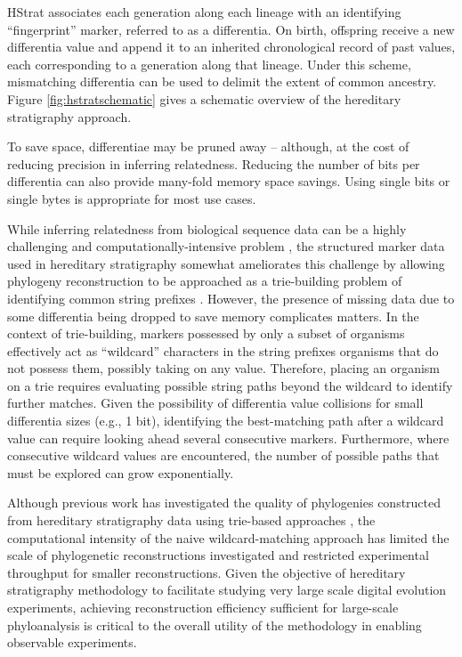 HStrat associates each generation along each lineage with an identifying ``fingerprint'' marker, referred to as a differentia.
On birth, offspring receive a new differentia value and append it to an inherited chronological record of past values, each corresponding to a generation along that lineage.
Under this scheme, mismatching differentia can be used to delimit the extent of common ancestry.
Figure \ref{fig:hstratschematic} gives a schematic overview of the hereditary stratigraphy approach.

To save space, differentiae may be pruned away -- although, at the cost of reducing precision in inferring relatedness.
Reducing the number of bits per differentia can also provide many-fold memory space savings.
Using single bits or single bytes is appropriate for most use cases.

While inferring relatedness from biological sequence data can be a highly challenging and computationally-intensive problem \citep{miller2010creating},
the structured marker data used in hereditary stratigraphy somewhat ameliorates this challenge by allowing phylogeny reconstruction to be approached as a trie-building problem of identifying common string prefixes \citep{delabriandais1959file,moreno2024analysis}.
However, the presence of missing data due to some differentia being dropped to save memory complicates matters.
In the context of trie-building, markers possessed by only a subset of organisms effectively act as ``wildcard'' characters in the string prefixes organisms that do not possess them, possibly taking on any value.
Therefore, placing an organism on a trie requires evaluating possible string paths beyond the wildcard to identify further matches.
Given the possibility of differentia value collisions for small differentia sizes (e.g., 1 bit), identifying the best-matching path after a wildcard value can require looking ahead several consecutive markers.
Furthermore, where consecutive wildcard values are encountered, the number of possible paths that must be explored can grow exponentially.

Although previous work has investigated the quality of phylogenies constructed from hereditary stratigraphy data using trie-based approaches \citep{moreno2025testing}, the computational intensity of the naive wildcard-matching approach has limited the scale of phylogenetic reconstructions investigated and restricted experimental throughput for smaller reconstructions.
Given the objective of hereditary stratigraphy methodology to facilitate studying very large scale digital evolution experiments, achieving reconstruction efficiency sufficient for large-scale phyloanalysis is critical to the overall utility of the methodology in enabling observable experiments.

